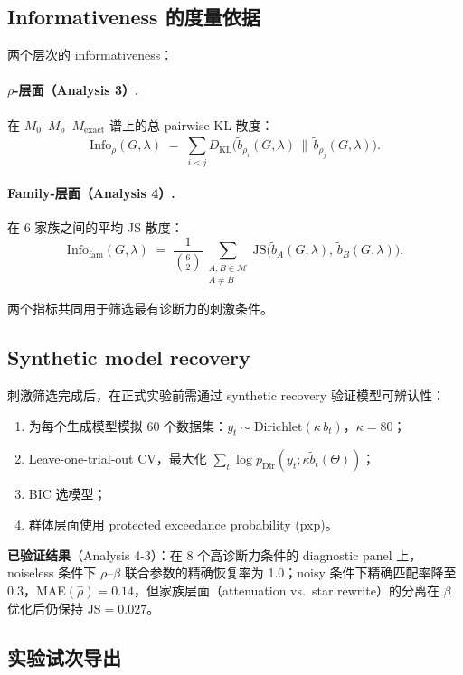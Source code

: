 \documentclass[11pt,a4paper]{ctexart}
\begin{document}
\subsection{Informativeness 的度量依据}

两个层次的 informativeness：

\paragraph{$\rho$-层面（Analysis 3）.}
在 $M_0$--$M_\rho$--$M_\mathrm{exact}$ 谱上的总 pairwise KL 散度：
\[
\mathrm{Info}_\rho(G,\lambda)
\;=\;
\sum_{i<j} D_\mathrm{KL}\!\bigl(\tilde{b}_{\rho_i}(G,\lambda)\,\big\|\,\tilde{b}_{\rho_j}(G,\lambda)\bigr).
\]

\paragraph{Family-层面（Analysis 4）.}
在 6 家族之间的平均 JS 散度：
\[
\mathrm{Info}_\mathrm{fam}(G,\lambda)
\;=\;
\frac{1}{\binom{6}{2}}
\sum_{\substack{A,B\in\mathcal{M}\\A\neq B}}
\mathrm{JS}\!\bigl(\tilde{b}_A(G,\lambda),\,\tilde{b}_B(G,\lambda)\bigr).
\]

两个指标共同用于筛选最有诊断力的刺激条件。

\subsection{Synthetic model recovery}

刺激筛选完成后，在正式实验前需通过 synthetic recovery 验证模型可辨认性：
\begin{enumerate}
    \item 为每个生成模型模拟 60 个数据集：$y_t\sim\mathrm{Dirichlet}(\kappa\,b_t)$，$\kappa=80$；
    \item Leave-one-trial-out CV，最大化 $\sum_t\log p_\mathrm{Dir}(y_t;\kappa\tilde{b}_t(\Theta))$；
    \item BIC 选模型；
    \item 群体层面使用 protected exceedance probability (pxp)。
\end{enumerate}

\textbf{已验证结果}（Analysis 4-3）：在 8 个高诊断力条件的 diagnostic panel 上，noiseless 条件下 $\rho$--$\beta$ 联合参数的精确恢复率为 1.0；noisy 条件下精确匹配率降至 0.3，MAE$(\hat\rho)=0.14$，但家族层面（attenuation vs.\ star rewrite）的分离在 $\beta$ 优化后仍保持 JS$=0.027$。

\subsection{实验试次导出}
\end{document}
